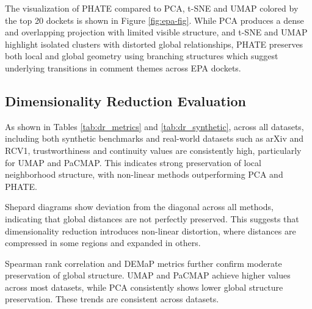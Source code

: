 The visualization of PHATE compared to PCA, t-SNE and UMAP colored by the top 20 dockets is shown in Figure \ref{fig:epa-fig}. While PCA produces a dense and overlapping projection with limited visible structure, and t-SNE and UMAP highlight isolated clusters with distorted global relationships, PHATE preserves both local and global geometry using branching structures which suggest underlying transitions in comment themes across EPA dockets.
\FloatBarrier
\subsection{Dimensionality Reduction Evaluation}

As shown in Tables \ref{tab:dr_metrics} and \ref{tab:dr_synthetic}, across all datasets, including both synthetic benchmarks and real-world datasets such as arXiv and RCV1, trustworthiness and continuity values are consistently high, particularly for UMAP and PaCMAP. This indicates strong preservation of local neighborhood structure, with non-linear methods outperforming PCA and PHATE.

Shepard diagrams show deviation from the diagonal across all methods, indicating that global distances are not perfectly preserved. This suggests that dimensionality reduction introduces non-linear distortion, where distances are compressed in some regions and expanded in others.

Spearman rank correlation and DEMaP metrics further confirm moderate preservation of global structure. UMAP and PaCMAP achieve higher values across most datasets, while PCA consistently shows lower global structure preservation. These trends are consistent across datasets.

